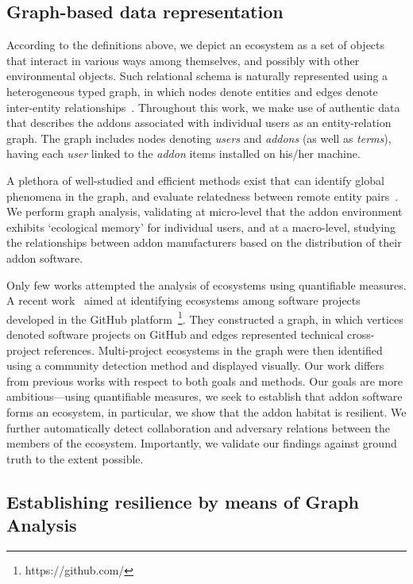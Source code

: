 \documentclass[ijoc,nonblindrev]{informs3} %
\numberwithin{equation}{subsection}
\begin{document}
\subsection{Graph-based data representation}
\label{sec:pagerank_related}

According to the definitions above, we depict an ecosystem as a set of objects that interact in various ways among themselves, and possibly with other environmental objects. Such relational schema is naturally represented using a heterogeneous typed graph, in which nodes denote entities and edges denote  inter-entity relationships~\citep{minkov2010improving,sunWSDM12}. Throughout this work, we make use of authentic data that describes the addons associated with individual users as an entity-relation graph. The graph includes nodes denoting {\it users} and {\it addons} (as well as {\it terms}), having each {\it user} linked to the {\it addon} items installed on his/her machine.

A plethora of well-studied and efficient methods exist that can identify global phenomena in the graph, and evaluate relatedness between remote entity pairs~\citep{kleinberg07,sun12}. We perform graph analysis, validating at micro-level that the addon environment exhibits `ecological memory' for individual users, and at a macro-level, studying the relationships between addon manufacturers based on the distribution of their addon software.  

Only few works attempted the analysis of ecosystems using quantifiable measures. A recent work~\citep{blincoeMSR15} aimed at identifying ecosystems among software projects developed in the GitHub platform~\footnote{https://github.com/}. They constructed a graph, in which vertices denoted software projects on GitHub and edges represented technical cross-project references. Multi-project ecosystems in the graph were then identified using a community detection method and displayed visually. Our work differs from previous works with respect to both goals and methods. Our goals are more ambitious---using quantifiable measures, we seek to establish that addon software forms an ecosystem, in particular, we show that the addon habitat is resilient. We further automatically detect collaboration and adversary relations between the members of the ecosystem. Importantly, we validate our findings against ground truth to the extent possible.

\subsection{Establishing resilience by means of Graph Analysis}
\label{sec:link_prediction}
\end{document}
